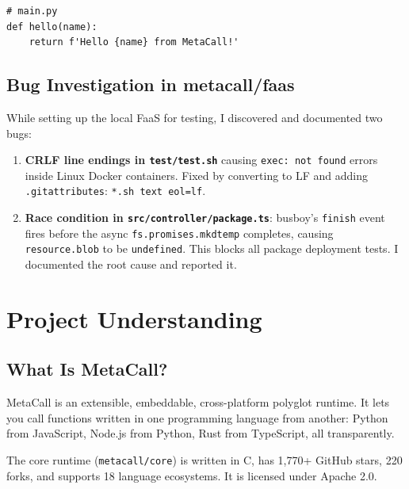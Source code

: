 \documentclass[12pt, a4paper]{article}
\begin{document}
\begin{lstlisting}[caption={hello-test Python function deployed via MCP},
  style=pyStyle]
# main.py
def hello(name):
    return f'Hello {name} from MetaCall!'
\end{lstlisting}

\subsection{Bug Investigation in metacall/faas}

While setting up the local FaaS for testing, I discovered and documented
two bugs:

\begin{enumerate}[leftmargin=1.5em, itemsep=4pt]
  \item \textbf{CRLF line endings in \texttt{test/test.sh}} causing
        \texttt{exec: not found} errors inside Linux Docker containers.
        Fixed by converting to LF and adding
        \texttt{.gitattributes}: \texttt{*.sh text eol=lf}.

  \item \textbf{Race condition in
        \texttt{src/controller/package.ts}}:
        busboy's \texttt{finish} event fires before the async
        \texttt{fs.promises.mkdtemp} completes, causing
        \texttt{resource.blob} to be \texttt{undefined}.
        This blocks all package deployment tests.
        I documented the root cause and reported it.
\end{enumerate}

\newpage
\section{Project Understanding}

\subsection{What Is MetaCall?}

MetaCall is an extensible, embeddable, cross-platform polyglot runtime.
It lets you call functions written in one programming language from
another: Python from JavaScript, Node.js from Python, Rust from
TypeScript, all transparently.

The core runtime (\texttt{metacall/core}) is written in C, has 1,770+
GitHub stars, 220 forks, and supports 18 language ecosystems. It is
licensed under Apache 2.0.
\end{document}
